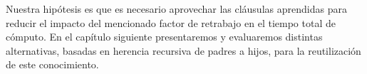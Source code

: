 Nuestra hipótesis es que es necesario aprovechar las cláusulas aprendidas para reducir el impacto del mencionado factor de retrabajo en el tiempo total de cómputo. En el capítulo siguiente presentaremos y evaluaremos distintas alternativas, basadas en herencia recursiva de padres a hijos, para la reutilización de este conocimiento.


%
